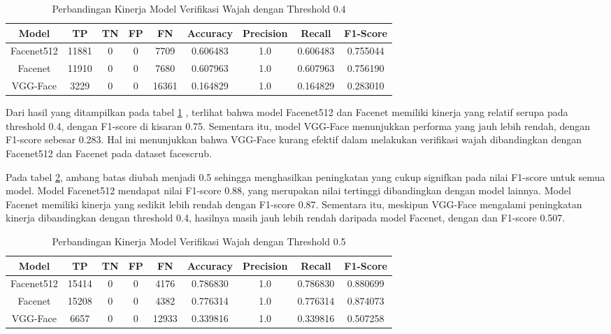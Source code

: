 \documentclass[a4paper, 11pt]{article}
\begin{document}
\begin{table}[h]
    \centering
    \begin{tabular}{|c|c|c|c|c|c|c|c|c|}
        \hline
        Model & TP & TN & FP & FN & Accuracy & Precision & Recall & F1-Score \\
        \hline
        Facenet512 & 11881 & 0 & 0 & 7709 & 0.606483 & 1.0 & 0.606483 & 0.755044 \\
        Facenet & 11910 & 0 & 0 & 7680 & 0.607963 & 1.0 & 0.607963 & 0.756190 \\
        VGG-Face & 3229 & 0 & 0 & 16361 & 0.164829 & 1.0 & 0.164829 & 0.283010 \\
        \hline
    \end{tabular}
    \caption{Perbandingan Kinerja Model Verifikasi Wajah dengan Threshold 0.4}
    \label{tab:face_models_04}
\end{table}

Dari hasil yang ditampilkan pada tabel \ref{tab:face_models_04} , terlihat bahwa model Facenet512 dan Facenet memiliki kinerja yang relatif serupa pada threshold 0.4, dengan  F1-score di kisaran 0.75. Sementara itu, model VGG-Face menunjukkan performa yang jauh lebih rendah, dengan F1-score sebesar 0.283. Hal ini menunjukkan bahwa VGG-Face kurang efektif dalam melakukan verifikasi wajah dibandingkan dengan Facenet512 dan Facenet pada dataset facescrub.

Pada tabel \ref{tab:face_models_05}, ambang batas diubah menjadi 0.5 sehingga menghasilkan peningkatan yang cukup signifkan pada nilai F1-score untuk semua model. Model Facenet512 mendapat nilai  F1-score 0.88, yang merupakan nilai tertinggi dibandingkan dengan model lainnya. Model Facenet memiliki kinerja yang sedikit lebih rendah dengan  F1-score 0.87. Sementara itu, meskipun VGG-Face mengalami peningkatan kinerja dibandingkan dengan threshold 0.4, hasilnya masih jauh lebih rendah daripada model Facenet, dengan dan F1-score 0.507.




\begin{table}[h]
    \centering
    \begin{tabular}{|c|c|c|c|c|c|c|c|c|}
        \hline
        Model & TP & TN & FP & FN & Accuracy & Precision & Recall & F1-Score \\
        \hline
        Facenet512 & 15414 & 0 & 0 & 4176 & 0.786830 & 1.0 & 0.786830 & 0.880699 \\
        Facenet & 15208 & 0 & 0 & 4382 & 0.776314 & 1.0 & 0.776314 & 0.874073 \\
        VGG-Face & 6657 & 0 & 0 & 12933 & 0.339816 & 1.0 & 0.339816 & 0.507258 \\
        \hline
    \end{tabular}
    \caption{Perbandingan Kinerja Model Verifikasi Wajah dengan Threshold 0.5}
    \label{tab:face_models_05}
\end{table}
\end{document}
